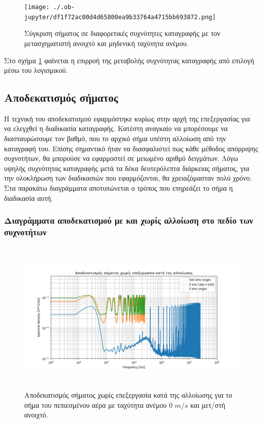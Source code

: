 \documentclass[breaklines=true, 12pt]{article}
\begin{document}
{{{\begin{figure}[H]
\centering
\texttt{[image: ./.ob-jupyter/df1f72ac00d4d65800ea9b33764a4715bb693872.png]}
\caption{\label{fig:sfreqComp}Σύγκριση σήματος σε διαφορετικές συχνότητες καταγραφής με τον μετασχηματιστή ανοιχτό και μηδενική ταχύτητα ανέμου.}
\end{figure}

Στο σχήμα \ref{fig:sfreqComp} φαίνεται η επιρροή της μεταβολής συχνότητας καταγραφής
από επιλογή μέσω του λογισμικού.
\subsection{Αποδεκατισμός σήματος}
\label{sec:org80012cf}
\label{sec:decimation-chapter}
Η τεχνική του αποδεκατισμού εφαρμόστηκε κυρίως στην αρχή της επεξεργασίας
για να ελεγχθεί η διαδικασία καταγραφής. Κατέστη αναγκαίο να μπορέσουμε
να διασταυρώσουμε τον βαθμό, που το αρχικό σήμα υπέστη αλλοίωση από την
καταγραφή του. Επίσης σημαντικό ήταν να διασφαλιστεί πως κάθε μέθοδος
απόρριψης συχνοτήτων, θα μπορούσε να εφαρμοστεί σε μειωμένο αριθμό
δειγμάτων. Λόγω υψηλής συχνότητας καταγραφής μετά τα δέκα δευτερόλεπτα
διάρκειας σήματος, για την ολοκλήρωση των διαδικασιών που εφαρμόζονται, θα
χρειαζόμασταν πολύ χρόνο. Στα παρακάτω διαγράμματα αποτυπώνεται ο τρόπος
που επηρεάζει το σήμα η διαδικασία αυτή.
\subsubsection{\textbf{Διαγράμματα αποδεκατισμού με και χωρίς αλλοίωση στο πεδίο των συχνοτήτων}}
\label{sec:org4ed0ff3}
\begin{figure}[htbp]
\centering
\includegraphics[width=500px,height=280px]{./decimation/with_aliasing.png}
\caption{\label{fig:with_al}Αποδεκατισμός σήματος χωρίς επεξεργασία κατά της αλλοίωσης για το σήμα του πεπιεσμένου αέρα με ταχύτητα ανέμου 0 \(m/s\) και μετ/στή ανοιχτό.}
\end{figure}

}}}
\end{document}
